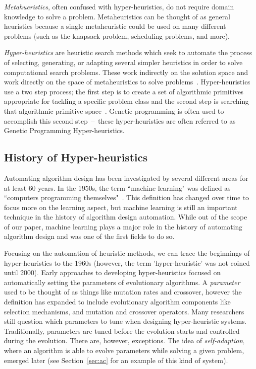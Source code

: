 \documentclass{sig-alternate}
\begin{document}
\textit{Metahueristics}, often confused with hyper-heuristics, do not require domain knowledge to solve a problem. Metaheuristics can be thought of as general heuristics because a single metaheuristic could be used on many different problems (such as the knapsack problem, scheduling problems, and more).~\cite{tauritz:tutorial}

\textit{Hyper-heuristics} are heuristic search methods which seek to automate the process of selecting, generating, or adapting several simpler heuristics in order to solve computational search problems. These work indirectly on the solution space and work directly on the space of metaheuristics to solve problems~\cite{tauritz:tutorial}. Hyper-heuristics use a two step process; the first step is to create a set of algorithmic primitives appropriate for tackling a specific problem class and the second step is searching that algorithmic primitive space~\cite{harris:2015}. Genetic programming is often used to accomplish this second step~--~these hyper-heuristics are often referred to as Genetic Programming Hyper-heuristics.

\subsection{History of Hyper-heuristics}
\label{sec:history}
Automating algorithm design has been investigated by several different areas for at least 60 years. In the 1950s, the term ``machine learning" was defined as ``computers programming themselves"~\cite{pappa:2014}. This definition has changed over time to focus more on the learning aspect, but machine learning is still an important technique in the history of algorithm design automation. While out of the scope of our paper, machine learning plays a major role in the history of automating algorithm design and was one of the first fields to do so.

Focusing on the automation of heuristic methods, we can trace the beginnings of hyper-heuristics to the 1960s (however, the term 'hyper-heuristic' was not coined until 2000). Early approaches to developing hyper-heuristics focused on automatically setting the parameters of evolutionary algorithms. A \textit{parameter} used to be thought of as things like mutation rates and crossover, however the definition has expanded to include evolutionary algorithm components like selection mechanisms, and mutation and crossover operators. Many researchers still question which parameters to tune when designing hyper-heuristic systems. Traditionally, parameters are tuned before the evolution starts and controlled during the evolution. There are, however, exceptions. The idea of \textit{self-adaption}, where an algorithm is able to evolve parameters while solving a given problem, emerged later (see Section~\ref{sec:ac} for an example of this kind of system).~\cite{pappa:2014}
\end{document}

